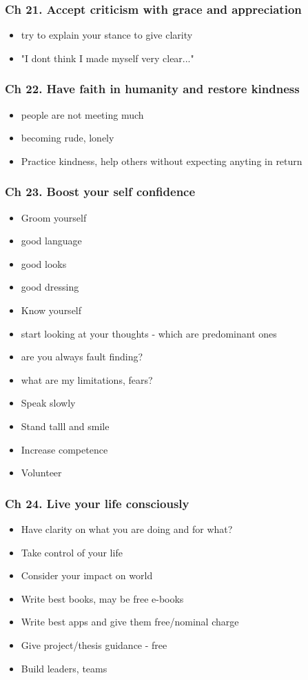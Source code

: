 \begin{frame}[fragile]
\frametitle{Ch 21. Accept criticism with grace and appreciation}
\begin{itemize}[noitemsep,nolistsep]
\item try to explain your stance to give clarity
\item "I dont think I made myself very clear..."
\end{itemize}
\end{frame}

\begin{frame}[fragile]
\frametitle{Ch 22. Have faith in humanity and restore kindness}
\begin{itemize}[noitemsep,nolistsep]
\item people are not meeting much
\item becoming rude, lonely
\item Practice kindness, help others without expecting anyting in return
\end{itemize}
\end{frame}

\begin{frame}[fragile]
\frametitle{Ch 23. Boost your self confidence}
\begin{itemize}[noitemsep,nolistsep]
\item Groom yourself
\item good language
\item good looks
\item good dressing
\item Know yourself
\item start looking at your thoughts - which are predominant ones
\item are you always fault finding?
\item what are my limitations, fears?
\item Speak slowly
\item Stand talll and smile
\item Increase competence
\item Volunteer
\end{itemize}
\end{frame}

\begin{frame}[fragile]
\frametitle{Ch 24. Live your life consciously}
\begin{itemize}[noitemsep,nolistsep]
\item Have clarity on what you are doing and for what?
\item Take control of your life
\item Consider your impact on world
\item Write best books, may be free e-books
\item Write best apps and give them free/nominal charge
\item Give project/thesis guidance - free
\item Build leaders, teams
\end{itemize}
\end{frame}
